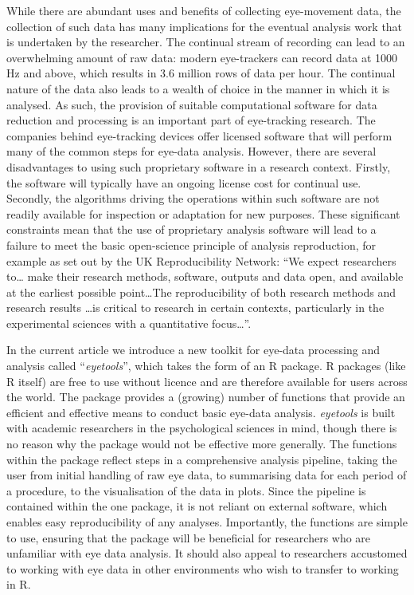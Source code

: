 \documentclass[
  man,
  floatsintext,
  longtable,
  nolmodern,
  notxfonts,
  notimes,
  colorlinks=true,linkcolor=blue,citecolor=blue,urlcolor=blue]{apa7}
\begin{document}
While there are abundant uses and benefits of collecting eye-movement
data, the collection of such data has many implications for the eventual
analysis work that is undertaken by the researcher. The continual stream
of recording can lead to an overwhelming amount of raw data: modern
eye-trackers can record data at 1000 Hz and above, which results in 3.6
million rows of data per hour. The continual nature of the data also
leads to a wealth of choice in the manner in which it is analysed. As
such, the provision of suitable computational software for data
reduction and processing is an important part of eye-tracking research.
The companies behind eye-tracking devices offer licensed software that
will perform many of the common steps for eye-data analysis. However,
there are several disadvantages to using such proprietary software in a
research context. Firstly, the software will typically have an ongoing
license cost for continual use. Secondly, the algorithms driving the
operations within such software are not readily available for inspection
or adaptation for new purposes. These significant constraints mean that
the use of proprietary analysis software will lead to a failure to meet
the basic open-science principle of analysis reproduction, for example
as set out by the UK Reproducibility Network: ``We expect researchers
to\ldots{} make their research methods, software, outputs and data open,
and available at the earliest possible point\ldots The reproducibility
of both research methods and research results \ldots is critical to
research in certain contexts, particularly in the experimental sciences
with a quantitative focus\ldots{}''.

In the current article we introduce a new toolkit for eye-data
processing and analysis called ``\emph{eyetools}'', which takes the form
of an R package. R packages (like R itself) are free to use without
licence and are therefore available for users across the world. The
package provides a (growing) number of functions that provide an
efficient and effective means to conduct basic eye-data analysis.
\emph{eyetools} is built with academic researchers in the psychological
sciences in mind, though there is no reason why the package would not be
effective more generally. The functions within the package reflect steps
in a comprehensive analysis pipeline, taking the user from initial
handling of raw eye data, to summarising data for each period of a
procedure, to the visualisation of the data in plots. Since the pipeline
is contained within the one package, it is not reliant on external
software, which enables easy reproducibility of any analyses.
Importantly, the functions are simple to use, ensuring that the package
will be beneficial for researchers who are unfamiliar with eye data
analysis. It should also appeal to researchers accustomed to working
with eye data in other environments who wish to transfer to working in
R.
\end{document}
